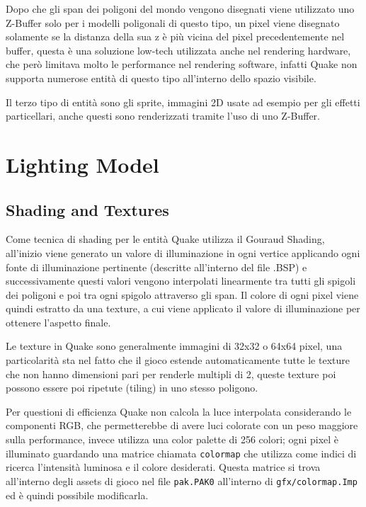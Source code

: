 \documentclass[12pt, letterpaper]{article}
\begin{document}
Dopo che gli span dei poligoni del mondo vengono disegnati viene utilizzato uno Z-Buffer solo per i modelli poligonali di questo tipo, un pixel viene disegnato solamente se la distanza della sua z è più vicina del pixel precedentemente nel buffer, questa è una soluzione low-tech utilizzata anche nel rendering hardware, che però limitava molto le performance nel rendering software, infatti Quake non supporta numerose entità di questo tipo all'interno dello spazio visibile.

Il terzo tipo di entità sono gli sprite, immagini 2D usate ad esempio per gli effetti particellari, anche questi sono renderizzati tramite l'uso di uno Z-Buffer.

\section{Lighting Model}

\subsection{Shading and Textures}

Come tecnica di shading per le entità Quake utilizza il Gouraud Shading, all'inizio viene generato un valore di illuminazione in ogni vertice applicando ogni fonte di illuminazione pertinente (descritte all'interno del file .BSP) e successivamente questi valori vengono interpolati linearmente tra tutti gli spigoli dei poligoni e poi tra ogni spigolo attraverso gli span. Il colore di ogni pixel viene quindi estratto da una texture, a cui viene applicato il valore di illuminazione per ottenere l'aspetto finale.

Le texture in Quake sono generalmente immagini di 32x32 o 64x64 pixel, una particolarità sta nel fatto che il gioco estende automaticamente tutte le texture che non hanno dimensioni pari per renderle multipli di 2, queste texture poi possono essere poi ripetute (tiling) in uno stesso poligono.

Per questioni di efficienza Quake non calcola la luce interpolata considerando le componenti RGB, che permetterebbe di avere luci colorate con un peso maggiore sulla performance, invece utilizza una color palette di 256 colori; ogni pixel è illuminato guardando una matrice chiamata \texttt{colormap} che utilizza come indici di ricerca l'intensità luminosa e il colore desiderati. Questa matrice si trova all'interno degli assets di gioco nel file \texttt{pak.PAK0} all'interno di \texttt{gfx/colormap.Imp} ed è quindi possibile modificarla.
\end{document}
